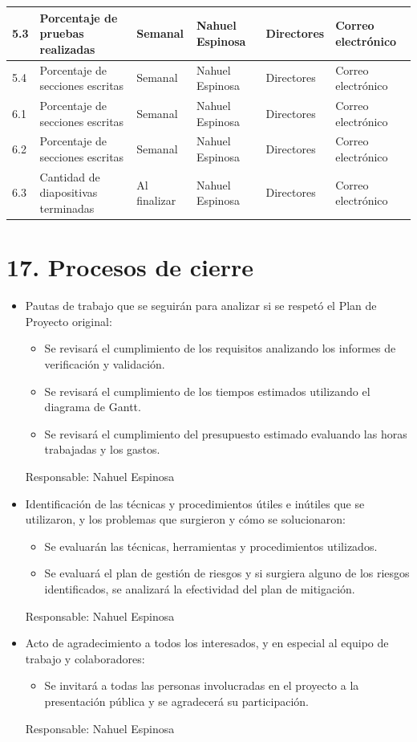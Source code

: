 \documentclass[11pt]{charter}
\begin{document}
\begin{table}[!htpb]
\begin{tabularx}{\linewidth}{@{}|m{1.5cm}|m{3cm}|X|X|X|X|@{}}
 5.3  & Porcentaje de pruebas realizadas                 & Semanal      & Nahuel Espinosa & Directores & Correo electrónico \\ \hline
 5.4  & Porcentaje de secciones escritas                 & Semanal      & Nahuel Espinosa & Directores & Correo electrónico \\ \hline
 6.1  & Porcentaje de secciones escritas                 & Semanal      & Nahuel Espinosa & Directores & Correo electrónico \\ \hline
 6.2  & Porcentaje de secciones escritas                 & Semanal      & Nahuel Espinosa & Directores & Correo electrónico \\ \hline
 6.3  & Cantidad de diapositivas terminadas              & Al finalizar & Nahuel Espinosa & Directores & Correo electrónico \\ \hline
\end{tabularx}%
\end{table}

\newpage

\section{17. Procesos de cierre}    
\label{sec:cierre}

\begin{itemize}
\item Pautas de trabajo que se seguirán para analizar si se respetó el Plan de Proyecto original:
\begin{itemize}
  \item Se revisará el cumplimiento de los requisitos analizando los informes de verificación y validación.
  \item Se revisará el cumplimiento de los tiempos estimados utilizando el diagrama de Gantt.
  \item Se revisará el cumplimiento del presupuesto estimado evaluando las horas trabajadas y los gastos.
\end{itemize}
Responsable: Nahuel Espinosa

\item Identificación de las técnicas y procedimientos útiles e inútiles que se utilizaron, y los problemas que surgieron y cómo se solucionaron:
\begin{itemize}
  \item Se evaluarán las técnicas, herramientas y procedimientos utilizados.
  \item Se evaluará el plan de gestión de riesgos y si surgiera alguno de los riesgos identificados, se analizará la efectividad del plan de mitigación.
\end{itemize}
Responsable: Nahuel Espinosa

\item Acto de agradecimiento a todos los interesados, y en especial al equipo de trabajo y colaboradores:
\begin{itemize}
  \item Se invitará a todas las personas involucradas en el proyecto a la presentación pública y se agradecerá su participación.
\end{itemize}
Responsable: Nahuel Espinosa
\end{itemize}
\end{document}
